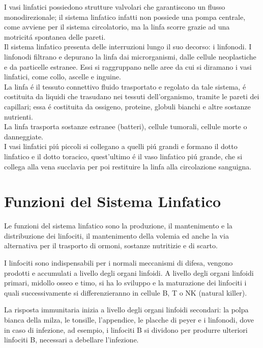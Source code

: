 I vasi linfatici possiedono strutture valvolari che garantiscono un flusso monodirezionale; 
il sistema linfatico infatti non possiede una pompa centrale, 
come avviene per il sistema circolatorio, ma la linfa scorre grazie ad una motricit\'a spontanea delle pareti.\\

Il sistema linfatico presenta delle interruzioni lungo il suo decorso: i linfonodi. 
I linfonodi filtrano e depurano la linfa dai microrganismi, dalle cellule neoplastiche e 
da particelle estranee. Essi si raggruppano nelle aree da cui si diramano i vasi linfatici, 
come collo, ascelle e inguine.\\

La linfa \'e il tessuto connettivo fluido trasportato e regolato da tale sistema, \'e costituita 
da liquidi che trasudano nei tessuti dell'organismo, tramite le pareti dei capillari; essa \'e costituita 
da ossigeno, proteine, globuli bianchi e altre sostanze nutrienti.\\ 
La linfa trasporta sostanze estranee (batteri), cellule tumorali, cellule morte o danneggiate.\\ 
I vasi linfatici pi\'u piccoli si collegano a quelli pi\'u grandi e formano il dotto linfatico e il dotto 
toracico, quest'ultimo \'e il vaso linfatico pi\'u grande, che si collega alla vena succlavia per poi restituire 
la linfa alla circolazione sanguigna\cite{BOOK1}. \\

\section{Funzioni del Sistema Linfatico}
Le funzioni del sistema linfatico sono la produzione, il mantenimento e la distribuzione dei linfociti, 
il mantenimento della volemia ed anche la via alternativa per il trasporto di ormoni,
 sostanze nutritizie e di scarto\cite{BOOK1}.


 I linfociti sono indispensabili per i normali meccanismi di difesa, vengono prodotti e accumulati a livello 
 degli organi linfoidi. 
 A livello degli organi linfoidi primari, midollo osseo e timo, si ha lo sviluppo e la maturazione dei linfociti 
 i quali successivamente si differenzieranno in cellule B, T o NK (natural killer)\cite{BOOK1}.
  
 La risposta immunitaria inizia a livello degli organi linfoidi secondari: la polpa bianca della milza, le tonsille, 
 l’appendice, le placche di peyer e i linfonodi, dove in caso di infezione, ad esempio,
 i linfociti B si dividono per produrre ulteriori linfociti B, necessari a debellare l’infezione.\\

